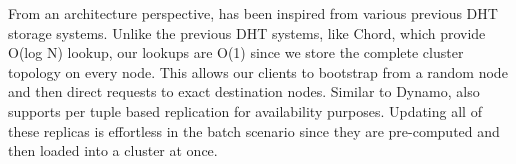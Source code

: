 From an architecture perspective, \projectname{} has been inspired from various previous DHT storage systems. Unlike the previous DHT systems, like Chord\cite{chord}, which provide O(log N) lookup, our lookups are O(1) since we store the complete cluster topology on every node. This allows our clients to bootstrap from a random node and then direct requests to exact destination nodes. Similar to Dynamo\cite{dynamo}, \projectname{} also supports per tuple based replication for availability purposes. Updating all of these replicas is effortless in the batch scenario since they are pre-computed and then loaded into a \projectname{} cluster at once. 

